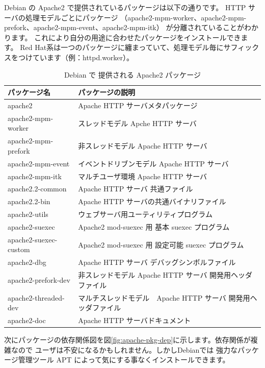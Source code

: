 \documentclass[mingoth,a4paper]{jsarticle}
\begin{document}
Debian の Apache2 で提供されているパッケージは以下の通りです。
HTTP サーバの処理モデルごとにパッケージ
（apache2-mpm-worker、apache2-mpm-prefork、apache2-mpm-event、apache2-mpm-itk）
が分離されていることがわかります。
これにより自分の用途に合わせたパッケージをインストールできます。
Red Hat系は一つのパッケージに纏まっていて、処理モデル毎にサフィックスをつけています（例：httpd.worker）。
\begin{table}[ht]
\begin{center}
\begin{tabular}{|l|l|}
\hline
パッケージ名 & パッケージの説明\\
\hline \hline
apache2 & Apache HTTP サーバメタパッケージ \\
\hline
apache2-mpm-worker & スレッドモデル Apche HTTP サーバ\\
\hline
apache2-mpm-prefork & 非スレッドモデル Apache HTTP サーバ\\
\hline
apache2-mpm-event & イベントドリブンモデル Apache HTTP サーバ\\
\hline
apache2-mpm-itk & マルチユーザ環境  Apache HTTP サーバ\\
\hline
apache2.2-common & Apache HTTP サーバ 共通ファイル \\
\hline
apache2.2-bin & Apache HTTP サーバの共通バイナリファイル\\
\hline
apache2-utils & ウェブサーバ用ユーティリティプログラム \\
\hline
apache2-suexec & Apache2 mod-suexec 用 基本 suexec プログラム \\
\hline
apache2-suexec-custom & Apache2 mod-suexec 用 設定可能 suexec プログラム \\
\hline
apache2-dbg & Apache HTTP サーバ デバッグシンボルファイル \\
\hline
apache2-prefork-dev & 非スレッドモデル Apache HTTP サーバ 開発用ヘッダファイル\\
\hline
apache2-threaded-dev & マルチスレッドモデル　Apache HTTP サーバ 開発用ヘッダファイル \\
\hline
apache2-doc & Apache HTTP サーバドキュメント \\
\hline
\end{tabular}
\caption{\label{tab:apache-pkg}Debian で 提供される Apache2 パッケージ}
\end{center}
\end{table}

次にパッケージの依存関係図を図\ref{fig:apache-pkg-dep}に示します。依存関係が複雑なので
ユーザは不安になるかもしれません。しかしDebianでは
強力なパッケージ管理ツール APT によって気にする事なくインストールできます。
\end{document}

